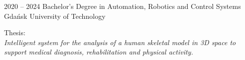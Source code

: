 \documentclass[9pt]{./packages/Developer_CV/developercv}
\begin{document}

\begin{entrylist}
    \entry
        {2020 -- 2024}
        {Bachelor's Degree in Automation, Robotics and Control Systems}
        {Gdańsk University of Technology}
        {
        \raggedright
        Thesis:\\
        \textit{Intelligent system for the analysis of a human skeletal model
        in 3D space to support medical diagnosis, rehabilitation and physical
        activity.}
        }
\end{entrylist}


\end{document}
